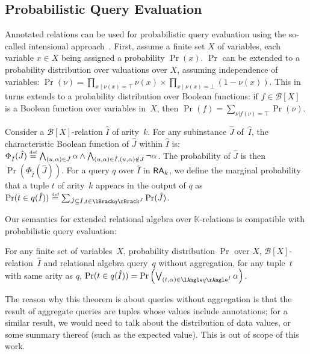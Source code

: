 \subsection{Probabilistic Query Evaluation}
\label{sec:pqe}

Annotated relations can be used for probabilistic query evaluation using
the so-called intensional approach~\cite{suciu2011probabilistic}. First,
assume a finite set $X$ of variables, each variable $x\in X$ being
assigned a probability $\Pr(x)$. $\Pr$ can be extended to a
probability distribution over valuations over $X$, assuming independence
of variables:
$\Pr(\nu)=\prod_{x\mid\nu(x)=\top}\nu(x)\times\prod_{x\mid\nu(x)=\bot}(1-\nu(x))$.
This in turns extends to a probability
distribution over Boolean functions: if $f\in\mathcal{B}[X]$ is a Boolean
function over variables in~$X$, then $\Pr(f)=\sum_{\nu|f(\nu)=\top} \Pr(\nu)$.

Consider a $\mathcal{B}[X]$-relation $\hat I$ of arity~$k$. For any
subinstance $\hat J$ of~$\hat I$, the characteristic Boolean function of
$\hat J$ within $\hat I$ is: \(\Phi_{\hat I}(\hat J)\overset{\text{\tiny def}}{=}\bigwedge_{(u,\alpha)\in
	\hat J}\alpha\land\bigwedge_{(u,\alpha)\in\hat I, (u,\alpha)\notin
	J}\lnot\alpha\). The probability of $\hat J$ is then $\Pr(\Phi_{\hat I}(\hat J))$.
For a query $q$ over $\hat I$ in $\mathsf{RA}_k$, we define the marginal probability that a
tuple $t$ of arity~$k$ appears in
the output of $q$ as $\Pr(t\in q(\hat I))\defeq\sum_{\hat J\subseteq\hat I, t\in
		\sem{J}{q}}\Pr(\hat J)$.

Our semantics for extended relational algebra over $\mathbb{K}$-relations is
compatible with probabilistic query evaluation:

\begin{theoremrep}
\laxmain{%
}%
\laxapp{%
}%
	\label{thm:pqe}
	For any finite set of variables~$X$, probability distribution $\Pr$
	over $X$, $\mathcal{B}[X]$-relation~$\hat I$
	and relational
	algebra query~$q$ without aggregation, for any tuple~$t$ with same
	arity as $q$,
	$\Pr(t\in q(\hat I))=\Pr\left(\bigvee_{(t,\alpha)\in \ansem{\hat I}{q}}\alpha\right)$.
\laxapp{%
}%
\laxmain{%
}%
\end{theoremrep}


The reason why this theorem is about queries without aggregation is
that the result of aggregate queries are tuples whose values include
annotations; for a similar result, we would need to talk about the
distribution of data values, or some summary thereof (such as the
expected value). This is out of scope of this work.

